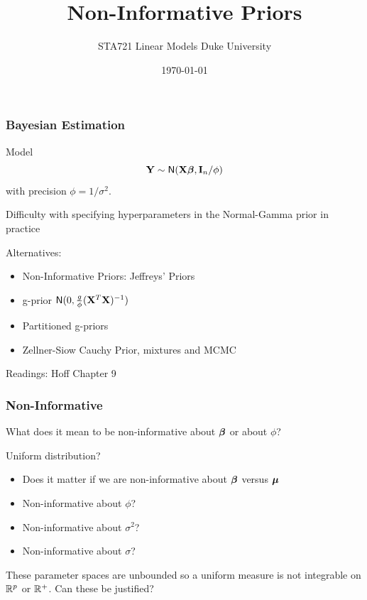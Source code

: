 \documentclass[handout]{beamer}\usepackage[]{graphicx}\usepackage[]{color}
\title{Non-Informative Priors}
\institute{Merlise Clyde}
\author{STA721 Linear Models Duke University}
\date{\today}
\begin{document}
\maketitle

\begin{frame}
  \frametitle{Bayesian Estimation}
  Model
$$
\mathbf{Y} \sim \textsf{N}(\mathbf{X} \boldsymbol{\beta}, \mathbf{I}_n/\phi)
$$
with precision $\phi = 1/\sigma^2$.
\pause

\vfill
Difficulty with specifying hyperparameters in the Normal-Gamma prior in practice

Alternatives:
\begin{itemize}
\item Non-Informative Priors: Jeffreys' Priors
\item g-prior  $\textsf{N}(0, \frac{g}{\phi}(\mathbf{X}^T\mathbf{X})^{-1})$
\item Partitioned g-priors
\item Zellner-Siow Cauchy Prior, mixtures and MCMC
\end{itemize}

Readings: Hoff Chapter 9
\end{frame}

\begin{frame}\frametitle{Non-Informative}

What does it mean to be non-informative about $\boldsymbol{\beta}$ or about $\phi$? \pause

Uniform distribution?  \pause

\begin{itemize}
  \item Does it matter if we are non-informative about $\boldsymbol{\beta}$ versus $\boldsymbol{\mu}$ \pause
  \item Non-informative about $\phi$? \pause
  \item Non-informative about $\sigma^2$? \pause
  \item Non-informative about $\sigma$? \pause
\end{itemize}

These parameter spaces are unbounded so a uniform measure is not integrable on $\mathbb{R}^p$ or $\mathbb{R}^+$.  Can these be justified?

\end{frame}
\end{document}
